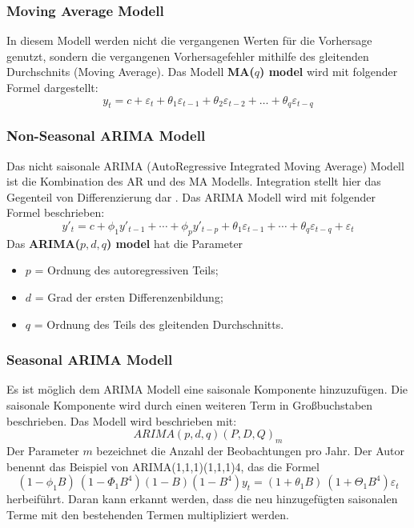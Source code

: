 \documentclass[12pt]{report}
\begin{document}
	\subsubsection{Moving Average Modell}
	In diesem Modell werden nicht die vergangenen Werten für die Vorhersage genutzt, sondern die vergangenen Vorhersagefehler mithilfe des gleitenden Durchschnits (Moving Average)\cite[Kapitel 8.4]{Hyndman.May2018}. Das Modell \textbf{MA($q$) model} wird mit folgender Formel dargestellt:\\
	\begin{equation}
		y_{t} = c + \varepsilon_t + \theta_{1}\varepsilon_{t-1} + \theta_{2}\varepsilon_{t-2} + \dots + \theta_{q}\varepsilon_{t-q}
	\end{equation}
	\subsubsection{Non-Seasonal ARIMA Modell}
	Das nicht saisonale ARIMA (AutoRegressive Integrated Moving Average) Modell ist die Kombination des AR und des MA Modells. Integration stellt hier das Gegenteil von Differenzierung dar \cite[Kapitel 8.5]{Hyndman.May2018}. Das ARIMA Modell wird mit folgender Formel beschrieben:
	\begin{equation}
		y'_{t} = c + \phi_{1}y'_{t-1} + \cdots + \phi_{p}y'_{t-p} + \theta_{1}\varepsilon_{t-1} + \cdots + \theta_{q}\varepsilon_{t-q} + \varepsilon_{t}
	\end{equation}
	Das \textbf{ARIMA($p,d,q$) model} hat die Parameter
	\begin{itemize}
		\item $p$ = Ordnung des autoregressiven Teils;
		\item $d$ = Grad der ersten Differenzenbildung;
		\item $q$ =	Ordnung des Teils des gleitenden Durchschnitts.
	\end{itemize}
	\subsubsection{Seasonal ARIMA Modell}
	Es ist möglich dem ARIMA Modell eine saisonale Komponente hinzuzufügen. Die saisonale Komponente wird durch einen weiteren Term in Großbuchstaben beschrieben. 
	Das Modell wird beschrieben mit:	
	\begin{equation}
		ARIMA (p, d, q) (P, D, Q)_m
	\end{equation}
	Der Parameter $m$ bezeichnet die Anzahl der Beobachtungen pro Jahr. Der Autor \cite[Kapitel 8.9]{Hyndman.May2018} benennt das Beispiel von ARIMA(1,1,1)(1,1,1)4, das die Formel 
	\begin{equation}
		(1 - \phi_{1}B)~(1 - \Phi_{1}B^{4}) (1 - B) (1 - B^{4})y_{t} =
		(1 + \theta_{1}B)~ (1 + \Theta_{1}B^{4})\varepsilon_{t}
	\end{equation}
	herbeiführt. Daran kann erkannt werden, dass die neu hinzugefügten saisonalen Terme mit den bestehenden Termen multipliziert werden. 
	
\end{document}
